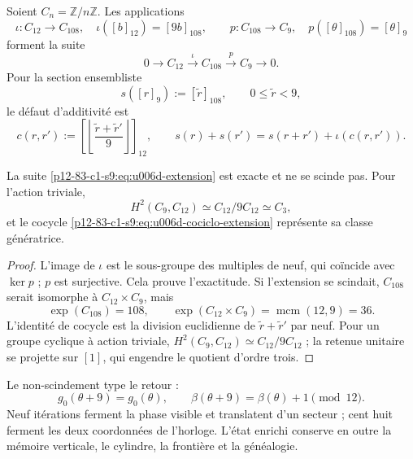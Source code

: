 {Soient \(C_n=\mathbb Z/n\mathbb Z\). Les applications
\begin{equation}
 \iota:C_{12}\longrightarrow C_{108},
 \quad \iota([b]_{12})=[9b]_{108},
 \qquad
 p:C_{108}\longrightarrow C_9,
 \quad p([\theta]_{108})=[\theta]_9
 \label{p12-83-c1-s9:eq:u006d-mapas-extension}
\end{equation}
forment la suite
\begin{equation}
 0\longrightarrow C_{12}
 \xrightarrow{\;\iota\;}C_{108}
 \xrightarrow{\;p\;}C_9
 \longrightarrow0.
 \label{p12-83-c1-s9:eq:u006d-extension}
\end{equation}
Pour la section ensembliste
\[
 s([r]_9):=[\widetilde r]_{108},
 \qquad 0\leq\widetilde r<9,
\]
le défaut d’additivité est
\begin{equation}
 c(r,r'):=
 \left[
 \left\lfloor
 \frac{\widetilde r+\widetilde r'}9
 \right\rfloor
 \right]_{12},
 \qquad
 s(r)+s(r')
 =s(r+r')+\iota(c(r,r')).
 \label{p12-83-c1-s9:eq:u006d-cociclo-extension}
\end{equation}

\begin{theorem}
\label{p12-83-c1-s9:thm:u006d-extension-no-escindida}
La suite \eqref{p12-83-c1-s9:eq:u006d-extension} est exacte et ne se scinde pas. Pour
l’action triviale,
\begin{equation}
 H^2(C_9,C_{12})
 \simeq C_{12}/9C_{12}
 \simeq C_3,
 \label{p12-83-c1-s9:eq:u006d-cohomologia-extension}
\end{equation}
et le cocycle \eqref{p12-83-c1-s9:eq:u006d-cociclo-extension} représente sa classe
génératrice.
\end{theorem}

\begin{proof}
L’image de \(\iota\) est le sous-groupe des multiples de neuf, qui coïncide
avec \(\ker p\) ; \(p\) est surjective. Cela prouve l’exactitude. Si
l’extension se scindait, \(C_{108}\) serait isomorphe à
\(C_{12}\times C_9\), mais
\[
 \exp(C_{108})=108,
 \qquad
 \exp(C_{12}\times C_9)=\operatorname{mcm}(12,9)=36.
\]
L’identité de cocycle est la division euclidienne de
\(\widetilde r+\widetilde r'\) par neuf. Pour un groupe cyclique à action
triviale,
\(H^2(C_9,C_{12})\simeq C_{12}/9C_{12}\) ; la retenue unitaire se projette sur
\([1]\), qui engendre le quotient d’ordre trois.
\end{proof}

Le non-scindement type le retour :
\[
 g_0(\theta+9)=g_0(\theta),
 \qquad
 \beta(\theta+9)=\beta(\theta)+1\pmod{12}.
\]
Neuf itérations ferment la phase visible et translatent d’un secteur ; cent
huit ferment les deux coordonnées de l’horloge. L’état enrichi conserve
en outre la mémoire verticale, le cylindre, la frontière et la généalogie.

}

